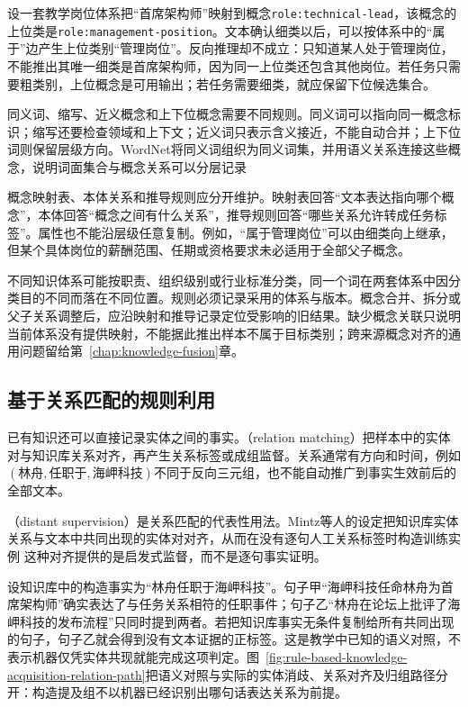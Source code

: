 设一套教学岗位体系把“首席架构师”映射到概念\texttt{role:\allowbreak{}technical-\allowbreak{}lead}，该概念的上位类是\texttt{role:\allowbreak{}management-\allowbreak{}position}。文本确认细类以后，可以按体系中的“属于”边产生上位类别“管理岗位”。反向推理却不成立：只知道某人处于管理岗位，不能推出其唯一细类是首席架构师，因为同一上位类还包含其他岗位。若任务只需要粗类别，上位概念是可用输出；若任务需要细类，就应保留下位候选集合。

同义词、缩写、近义概念和上下位概念需要不同规则。同义词可以指向同一概念标识；缩写还要检查领域和上下文；近义词只表示含义接近，不能自动合并；上下位词则保留层级方向。WordNet将同义词组织为同义词集，并用语义关系连接这些概念，说明词面集合与概念关系可以分层记录

概念映射表、本体关系和推导规则应分开维护。映射表回答“文本表达指向哪个概念”，本体回答“概念之间有什么关系”，推导规则回答“哪些关系允许转成任务标签”。属性也不能沿层级任意复制。例如，“属于管理岗位”可以由细类向上继承，但某个具体岗位的薪酬范围、任期或资格要求未必适用于全部父子概念。

不同知识体系可能按职责、组织级别或行业标准分类，同一个词在两套体系中因分类目的不同而落在不同位置。规则必须记录采用的体系与版本。概念合并、拆分或父子关系调整后，应沿映射和推导记录定位受影响的旧结果。缺少概念关联只说明当前体系没有提供映射，不能据此推出样本不属于目标类别；跨来源概念对齐的通用问题留给第~\ref{chap:knowledge-fusion}章。

\subsection{基于关系匹配的规则利用}
\label{sec:rule-based-knowledge-acquisition-relation-matching}

已有知识还可以直接记录实体之间的事实。（relation matching）把样本中的实体对与知识库关系对齐，再产生关系标签或成组监督。关系通常有方向和时间，例如$(\text{林舟},\text{任职于},\text{海岬科技})$不同于反向三元组，也不能自动推广到事实生效前后的全部文本。

（distant supervision）是关系匹配的代表性用法。Mintz等人的设定把知识库实体关系与文本中共同出现的实体对对齐，从而在没有逐句人工关系标签时构造训练实例 这种对齐提供的是启发式监督，而不是逐句事实证明。

设知识库中的构造事实为“林舟任职于海岬科技”。句子甲“海岬科技任命林舟为首席架构师”确实表达了与任务关系相符的任职事件；句子乙“林舟在论坛上批评了海岬科技的发布流程”只同时提到两者。若把知识库事实无条件复制给所有共同出现的句子，句子乙就会得到没有文本证据的正标签。这是教学中已知的语义对照，不表示机器仅凭实体共现就能完成这项判定。图~\ref{fig:rule-based-knowledge-acquisition-relation-path}把语义对照与实际的实体消歧、关系对齐及归组路径分开：构造提及组不以机器已经识别出哪句话表达关系为前提。

